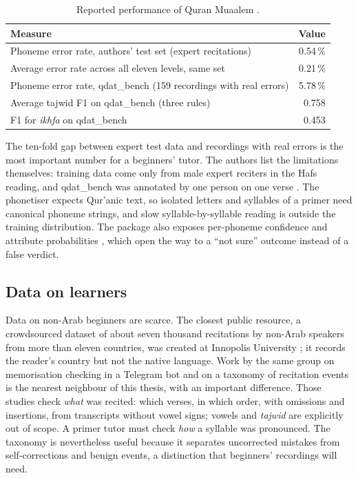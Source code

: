 \documentclass[a4paper,14pt]{extarticle}
\begin{document}
\begin{table}[ht]
\centering\small
\caption{Reported performance of Quran Muaalem \cite{SRC-002}.}
\label{tab:muaalem}
\begin{tabularx}{\linewidth}{@{}Lr@{}}
\toprule
Measure & Value \\
\midrule
Phoneme error rate, authors' test set (expert recitations) & 0.54\,\% \\
Average error rate across all eleven levels, same set & 0.21\,\% \\
Phoneme error rate, qdat\_bench (159 recordings with real errors) & 5.78\,\% \\
Average tajwid F1 on qdat\_bench (three rules) & 0.758 \\
F1 for \emph{ikhfa} on qdat\_bench & 0.453 \\
\bottomrule
\end{tabularx}
\end{table}

The ten-fold gap between expert test data and recordings with real errors is the most important number
for a beginners' tutor. The authors list the limitations themselves: training data come only from male
expert reciters in the Hafs reading, and qdat\_bench was annotated by one person on one verse
\cite{SRC-002}. The phonetiser expects Qur'anic text, so isolated letters and syllables of a primer need
canonical phoneme strings, and slow syllable-by-syllable reading is outside the training distribution.
The package also exposes per-phoneme confidence and attribute probabilities \cite{SRC-062}, which open
the way to a ``not sure'' outcome instead of a false verdict.

\subsection{Data on learners}

Data on non-Arab beginners are scarce. The closest public resource, a crowdsourced dataset of about seven
thousand recitations by non-Arab speakers from more than eleven countries, was created at Innopolis
University \cite{SRC-032}; it records the reader's country but not the native language. Work by the same group on
memorisation checking in a Telegram bot \cite{SRC-067} and on a taxonomy of recitation events
\cite{SRC-068} is the nearest neighbour of this thesis, with an important difference. Those studies
check \emph{what} was recited: which verses, in which order, with omissions and insertions, from
transcripts without vowel signs; vowels and \emph{tajwid} are explicitly out of scope. A primer tutor must
check \emph{how} a syllable was pronounced. The taxonomy is nevertheless useful because it separates
uncorrected mistakes from self-corrections and benign events, a distinction that beginners' recordings
will need.
\end{document}
